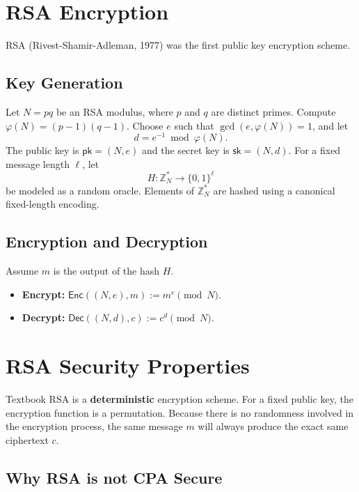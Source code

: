 \documentclass[
  letterpaper,
]{scrbook}
\providecommand{\tightlist}{%
  \setlength{\itemsep}{0pt}\setlength{\parskip}{0pt}}
\newcommand{\Enc}{\mathsf{Enc}}
\newcommand{\Dec}{\mathsf{Dec}}
\theoremstyle{definition}
\theoremstyle{plain}
\theoremstyle{plain}
\theoremstyle{remark}
\begin{document}
\section{RSA Encryption}\label{rsa-encryption}

RSA (Rivest-Shamir-Adleman, 1977) was the first public key encryption
scheme.

\subsection{Key Generation}\label{key-generation}

Let \(N=pq\) be an RSA modulus, where \(p\) and \(q\) are distinct
primes. Compute \(\varphi(N) = (p-1)(q-1)\). Choose \(e\) such that
\(\gcd(e,\varphi(N))=1\), and let \[
    d = e^{-1} \bmod \varphi(N).
\] The public key is \(\mathsf{pk}=(N,e)\) and the secret key is
\(\mathsf{sk}=(N,d)\). For a fixed message length \(\ell\), let \[
    H:\mathbb{Z}_N^{*}\longrightarrow\{0,1\}^{\ell}
\] be modeled as a random oracle. Elements of \(\mathbb{Z}_N^{*}\) are
hashed using a canonical fixed-length encoding.

\subsection{Encryption and Decryption}\label{encryption-and-decryption}

Assume \(m\) is the output of the hash \(H\).

\begin{itemize}
\tightlist
\item
  \textbf{Encrypt:} \(\Enc((N, e), m) := m^e \pmod N\).
\item
  \textbf{Decrypt:} \(\Dec((N, d), c) := c^d \pmod N\).
\end{itemize}

\section{RSA Security Properties}\label{rsa-security-properties}

Textbook RSA is a \textbf{deterministic} encryption scheme. For a fixed
public key, the encryption function is a permutation. Because there is
no randomness involved in the encryption process, the same message \(m\)
will always produce the exact same ciphertext \(c\).

\subsection{Why RSA is not CPA Secure}\label{why-rsa-is-not-cpa-secure}
\end{document}
